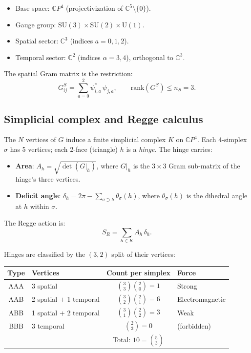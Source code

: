\documentclass[12pt]{article}
\theoremstyle{remark}
\begin{document}
\begin{itemize}
\item Base space: $\mathbb{C}P^4$ (projectivization of
  $\mathbb{C}^5 \setminus \{0\}$).
\item Gauge group: $\mathrm{SU}(3) \times \mathrm{SU}(2) \times
  \mathrm{U}(1)$.
\item Spatial sector: $\mathbb{C}^3$ (indices $a = 0, 1, 2$).
\item Temporal sector: $\mathbb{C}^2$ (indices $\alpha = 3, 4$),
  orthogonal to $\mathbb{C}^3$.
\end{itemize}

The spatial Gram matrix is the restriction:
\begin{equation}
G^S_{ij} = \sum_{a=0}^{2} \psi^*_{i,a}\, \psi_{j,a}, \qquad
\mathrm{rank}(G^S) \leq n_S = 3.
\label{eq:GS}
\end{equation}

\subsection{Simplicial complex and Regge calculus}

The $N$ vertices of $G$ induce a finite simplicial complex $K$ on
$\mathbb{C}P^4$. Each 4-simplex $\sigma$ has 5 vertices; each 2-face
(triangle) $h$ is a \emph{hinge}. The hinge carries:

\begin{itemize}
\item \textbf{Area}: $A_h = \sqrt{\det(G|_h)}$, where $G|_h$ is the
  $3 \times 3$ Gram sub-matrix of the hinge's three vertices.
\item \textbf{Deficit angle}: $\delta_h = 2\pi -
  \sum_{\sigma \supset h} \theta_\sigma(h)$, where $\theta_\sigma(h)$
  is the dihedral angle at $h$ within $\sigma$.
\end{itemize}

\noindent
The Regge action \cite{Regge} is:
\begin{equation}
\boxed{S_R = \sum_{h \in K} A_h\, \delta_h.}
\label{eq:Regge}
\end{equation}

Hinges are classified by the $(3,2)$ split of their vertices:

\begin{center}
\begin{tabular}{clcl}
\hline
Type & Vertices & Count per simplex & Force \\
\hline
AAA & 3 spatial & $\binom{3}{3}\binom{2}{0} = 1$ & Strong \\
AAB & 2 spatial $+$ 1 temporal & $\binom{3}{2}\binom{2}{1} = 6$ &
  Electromagnetic \\
ABB & 1 spatial $+$ 2 temporal & $\binom{3}{1}\binom{2}{2} = 3$ &
  Weak \\
BBB & 3 temporal & $\binom{2}{3} = 0$ & (forbidden) \\
\hline
& & Total: $10 = \binom{5}{3}$ & \\
\hline
\end{tabular}
\end{center}
\end{document}
